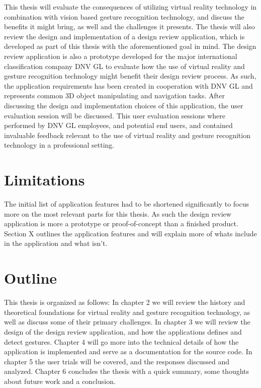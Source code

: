 This thesis will evaluate the consequences of utilizing virtual reality technology in combination with vision based gesture recognition technology, and discuss the benefits it 
might bring, as well and the challenges it presents. 
The thesis will also review the design and implementation of a design review application, which is developed as part of this thesis with the aforementioned goal in mind. 
The design review application is also a prototype developed for the major international classification company DNV GL to evaluate how the use of virtual reality and gesture
recognition technology might benefit their design review process. As such, the application requirements has been created in cooperation with DNV GL and represents
common 3D object manipulating and navigation tasks. After discussing the design and implementation choices of this application, the user evaluation session will be discussed. 
This user evaluation sessions where performed by DNV GL employees, and potential end users, and contained invaluable feedback relevant to the use of virtual reality and gesture
recognition technology in a professional setting. 

\section{Limitations}
The initial list of application features had to be shortened significantly to focus more on the most relevant parts for this thesis. As such the design review application
is more a prototype or proof-of-concept than a finished product. Section X outlines the application features and will explain more of whats include in the application and what isn't. 

\section{Outline}
This thesis is organized as follows: In chapter 2 we will review the history and theoretical foundations for virtual reality and gesture recognition technology, as well
as discuss some of their primary challenges. In chapter 3 we will review the design of the design review application, and how the applications defines and detect gestures. 
Chapter 4 will go more into the technical details of how the application is implemented and serve as a documentation for the source code.
In chapter 5 the user trials will be covered, and the responses discussed and analyzed.
Chapter 6 concludes the thesis with a quick summary, some thoughts about future work and a conclusion.

